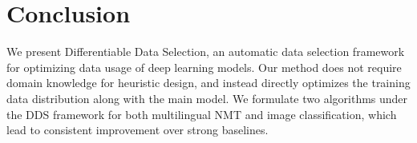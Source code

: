\section{\label{sec:conclusion}Conclusion}
We present Differentiable Data Selection, an automatic data selection framework for optimizing data usage of deep learning models. Our method does not require domain knowledge for heuristic design, and instead directly optimizes the training data distribution along with the main model. We formulate two algorithms under the DDS framework for both multilingual NMT and image classification, which lead to consistent improvement over strong baselines. 

